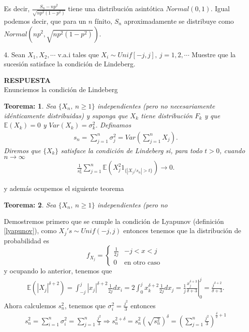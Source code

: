 \documentclass[11pt,letterpaper]{article}
\newcommand{\mE}{\mathbb{E}}
\newcommand{\res}{\textbf{RESPUESTA}\\}
\newtheorem{thmt}{Teorema:}
\newcommand{\s}{\sum_{i=1}^n}
\begin{document}
Es decir, $\frac{S_n-np^2}{\sqrt{np^2(1-p^2)}}$ tiene una distribución asintótica $Normal(0,1)$. Igual podemos decir, que para un $n$ fínito, $S_n$ aproximadamente se distribuye como $Normal(np^2, \sqrt{np^2(1-p^2)})$.

4. Sean $X_1, X_2, \cdots $ v.a.i tales que $X_i\sim Unif[-j, j],\ j=1,2,\cdots$ Muestre que la sucesión satisface la condición de Lindeberg. 

\res Enunciemos la condición de Lindeberg
\begin{framed}
    \begin{thmt} \label{lindeberg}
	Sea $\{X_n,\ n\geq 1 \}$ independientes (pero no necesariamente idénticamente distribuidas) y suponga que $X_k$ tiene distribución $F_k$ y que $\mE(X_k)=0$ y $Var(X_k)=\sigma_k^2$. Definamos 
	\begin{align*}
	s_n=\sum_{j=1}^n \sigma^2_j =Var(\sum_{j=1}^n X_j).
	\end{align*}
	Diremos que $\{ X_k\}$ satisface la condición de Lindeberg si, para todo $t>0$, cuando $n\rightarrow \infty$
	\begin{align*}
	\frac{1}{s_n^2} \sum_{j=1}^n\mE(X_j^2 1_{\{|X_j/s_n|>t \} }) \rightarrow 0.
	\end{align*}
    \end{thmt}
\end{framed}
y además ocupemos el siguiente teorema
\begin{framed}
    \begin{thmt} \label{lyapunov_lindeberg}
	Sea $\{X_n,\ n\geq 1 \}$ independientes (pero no 
    \end{thmt}
\end{framed}
Demostremos primero que se cumple la condición de Lyapunov (definición \ref{lyapunov}), como $X_j's\sim Unif(-j, j)$ entonces tenemos que la distribución de probabilidad es $$f_{X_j}=\left\{\begin{array}{cc}
\frac{1}{2j} & -j<x<j\\
0 & \text{en otro caso }
\end{array} \right.$$ 
y ocupando lo anterior, tenemos que  
\begin{align*}
\mE\left(|X_j|^{\delta+2}\right)=\int_{-j}^j |x_j|^{\delta+2} \frac{1}{2j} dx_i= 2 \int_0^j x_k^{\delta +2} \frac{1}{2j} dx_j = \frac{1}{j}\left.\frac{x_j^{\delta+3}}{\delta+3} \right|_0^{j}=\frac{j^{\delta+2}}{\delta+3}.
\end{align*}
Ahora calculemos $s_n^2$, tenemos que $\sigma_i^2=\frac{j^2}{3}$ entonces
\begin{align*}
s_n^2=\s \sigma_i^2 = \sum_{j=1}^n  \frac{j^2}{3} \Rightarrow s_n^{2+\delta}=s_n^2\left(\sqrt{s_n^2}\right)^\delta=\left(\sum_{j=1}^n \frac{j^2}{3}\right)^{\frac{\delta}{2}+1}
\end{align*}
\end{document}
